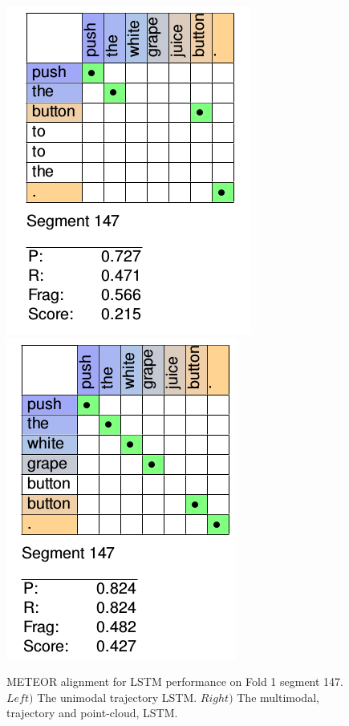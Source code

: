 \documentclass[letterpaper, 12 pt, conference]{ieeeconf}
\begin{document}
\begin{figure}[h]
\centering
\includegraphics[scale=0.35]{lstm_alignment}
\includegraphics[scale=0.35]{multimodal_lstm_grape}
\caption{METEOR alignment for LSTM performance on Fold 1 segment 147. $Left)$ The unimodal trajectory LSTM. $Right)$ The multimodal, trajectory and point-cloud, LSTM.} 
\label{fig:lstm_alignment}
\end{figure}
\end{document}
